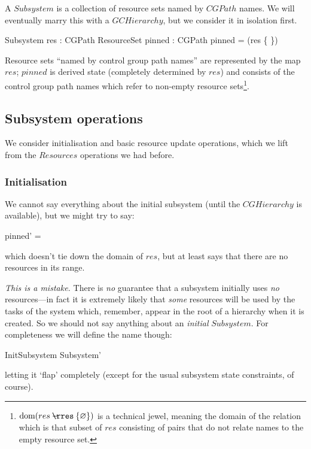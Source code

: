 \documentclass[a4paper,twoside,12pt]{article}
\begin{document}
A $Subsystem$ is a collection of resource sets named by $CGPath$ names. We will eventually marry
this with a $GCHierarchy$, but we consider it in isolation first.
\begin{schema}{Subsystem}
res : CGPath \ffun ResourceSet
\also
pinned : \finset CGPath
\where
pinned = \dom(res \nrres \{ \emptyset \})
\end{schema}
Resource sets ``named by control group path names'' are represented by the map $res$;
$pinned$ is derived state (completely determined by $res$) and consists of the control group path
names which refer to non-empty resource sets\footnote{$\dom(res \nrres \{ \emptyset \})$
is a technical jewel, meaning the domain
of the relation which is that subset of $res$ consisting of pairs that do not relate names to the empty
resource set.}.

\subsection{Subsystem operations}
We consider initialisation
and basic resource update operations, which we lift from the $Resources$ operations we had before.

\subsubsection{Initialisation}
We cannot say everything about the initial subsystem (until the $CGHierarchy$ is available), but we might try to
say:
\begin{zed}
pinned' = \emptyset
\end{zed}
which doesn't tie down the domain of $res$, but at least says that there are no resources in its range.

\emph{This is a mistake.}
There is \emph{no} guarantee that a subsystem initially uses \emph{no} resources---in fact it is
extremely likely that \emph{some} resources will be used by the tasks of the system which, remember, appear in the
root of a hierarchy when
it is created. So we should not say anything about an \emph{initial} $Subsystem$.
For completeness we will define the name though:
\begin{zed}
InitSubsystem  Subsystem'
\end{zed}
letting it `flap' completely (except for the usual subsystem state constraints, of course).
\end{document}

